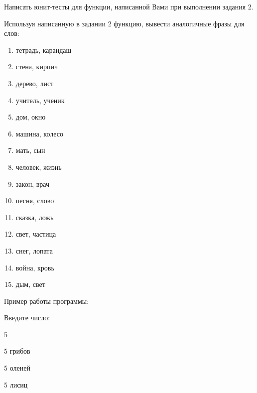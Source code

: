 \labtask

Написать юнит-тесты для функции, написанной Вами при выполнении задания 2.

\labtask

Используя написанную в задании 2 функцию, вывести аналогичные фразы для слов:

\begin{enumerate}

\item 	тетрадь, карандаш

\item 	стена, кирпич

\item 	дерево, лист

\item 	учитель, ученик

\item 	дом, окно

\item 	машина, колесо

\item 	мать, сын

\item 	человек, жизнь

\item 	закон, врач

\item 	песня, слово

\item 	сказка, ложь

\item 	свет, частица

\item 	снег, лопата

\item 	война, кровь

\item 	дым, свет


\end{enumerate}

Пример работы программы:

Введите число:

5

5 грибов

5 оленей

5 лисиц  

